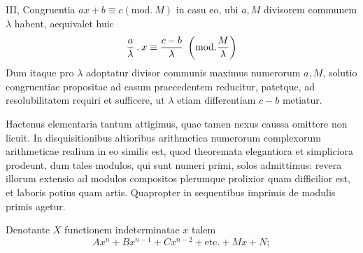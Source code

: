 III, Congruentia $ax+b\equiv c(\mathrm{mod.}\ M)$ in casu eo, ubi $a,M$ divisorem communem $\lambda$ habent, aequivalet huic
\[
\frac a\lambda\mathbin{.} x\equiv\frac{c-b}\lambda\ \left(\mathrm{mod.}\frac M\lambda\right)
\]
Dum itaque pro $\lambda$ adoptatur divisor communis maximus numerorum $a,M$, solutio congruentiae propositae ad casum praecedentem reducitur, patetque, ad resolubilitatem requiri et sufficere, ut $\lambda$ etiam differentiam $c-b$ metiatur.

Hactenus elementaria tantum attigimus, quae tamen nexus caussa omittere non licuit. In disquisitionibus altioribus arithmetica numerorum complexorum arithmeticae realium in eo similis est, quod theoremata elegantiora et simpliciora prodeunt, dum tales modulos, qui sunt numeri primi, solos admittimus: revera illorum extensio ad modulos compositos plerumque prolixior quam difficilior est, et laboris potius quam artis. Quapropter in sequentibus imprimis de modulis primis agetur.

Denotante $X$ functionem indeterminatae $x$ talem
\[
Ax^n+Bx^{n-1}+Cx^{n-2}+\text{etc.}+Mx+N;
\]
